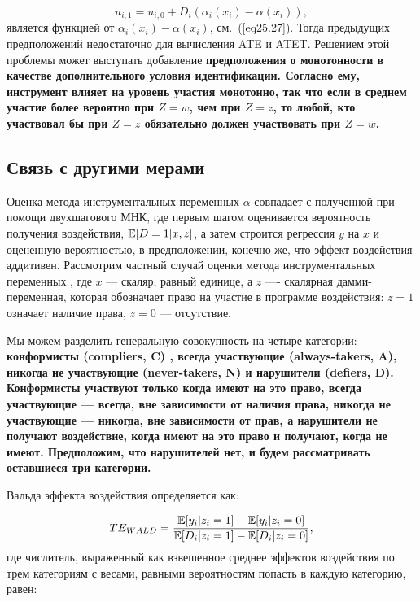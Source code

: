 $$
u_{i,1} = u_{i,0} + D_i (\alpha_i (x_i) - \alpha (x_i)),
$$
является функцией от $\alpha_i (x_i) - \alpha (x_i)$, см.~(\ref{eq25.27}). Тогда предыдущих предположений недостаточно для вычисления ATE и ATET. Решением этой проблемы может выступать добавление \bfseries предположения о монотонности \mdseries в качестве дополнительного условия идентификации. Согласно ему, инструмент влияет на уровень участия монотонно, так что если в среднем участие более вероятно при $Z = w$, чем при $Z = z$, то любой, кто участвовал бы при $Z = z$ обязательно должен участвовать при $Z = w$. 

\subsection{Связь с другими мерами}

Оценка метода инструментальных переменных $\alpha$ совпадает с полученной при помощи двухшагового МНК, где первым шагом оценивается вероятность получения воздействия, $\mathbb{E}[D = 1 | x, z]$, а затем строится регрессия $y$ на $x$ и оцененную вероятностью, в предположении, конечно же, что эффект воздействия аддитивен. Рассмотрим частный случай оценки метода инструментальных переменных , где $x$ --- скаляр, равный единице, а $z$ ---- скалярная дамми-переменная, которая обозначает право на участие в программе воздействия: $z=1$ означает наличие права, $z=0$ --- отсутствие. 

Мы можем разделить генеральную совокупность на четыре категории: \bfseries конформисты (compliers, C) \mdseries, \bfseries всегда участвующие (always-takers, A)\mdseries, \bfseries никогда не участвующие (never-takers, N) \mdseries и \bfseries нарушители (defiers, D)\mdseries. Конформисты участвуют только когда имеют на это право, всегда участвующие --- всегда, вне зависимости от наличия права, никогда не участвующие --- никогда, вне зависимости от прав, а нарушители не получают воздействие, когда имеют на это право и получают, когда не имеют. Предположим, что нарушителей нет, и будем рассматривать оставшиеся три категории. 

 Вальда \mdseries эффекта воздействия определяется как:

\begin{equation}
\label{eq25.68}
TE_{WALD} = \frac{\mathbb{E}[y_i | z_i = 1] - \mathbb{E}[y_i | z_i = 0] }{\mathbb{E}[D_i | z_i = 1] - \mathbb{E}[D_i | z_i = 0]},
\end{equation}
где числитель, выраженный как взвешенное среднее эффектов воздействия по трем категориям с весами, равными вероятностям попасть в каждую категорию, равен:

